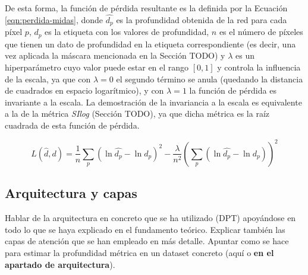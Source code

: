 De esta forma, la función de pérdida resultante es la definida por la Ecuación \ref{eqn:perdida-midas}, donde $\hat{d_p}$ es la profundidad obtenida de la red para cada píxel $p$, $d_p$ es la etiqueta con los valores de profundidad, $n$ es el número de píxeles que tienen un dato de profundidad en la etiqueta correspondiente (es decir, una vez aplicada la máscara mencionada en la Sección TODO) y $\lambda$ es un hiperparámetro cuyo valor puede estar en el rango $[0, 1]$ y controla la influencia de la escala, ya que con $\lambda=0$ el segundo término se anula (quedando la distancia de cuadrados en espacio logarítmico), y con $\lambda=1$ la función de pérdida es invariante a la escala. La demostración de la invariancia a la escala es equivalente a la de la métrica \textit{SIlog} (Sección TODO), ya que dicha métrica es la raíz cuadrada de esta función de pérdida.

\begin{equation}
\label{eqn:perdida-midas}
L(\hat{d}, d) = \frac{1}{n}\sum_{p} (\ln{\hat{d_p}} - \ln{d_p})^2 - \frac{\lambda}{n^2} \left( \sum_{p} (\ln{\hat{d_p}} - \ln{d_p}) \right)^2
\end{equation}

\subsection{Arquitectura y capas}
Hablar de la arquitectura en concreto que se ha utilizado (DPT) apoyándose en todo lo que se haya explicado en el fundamento teórico. Explicar también las capas de atención que se han empleado en más detalle.
Apuntar como se hace para estimar la profundidad métrica en un dataset concreto (aquí o \textbf{en el apartado de arquitectura}).


